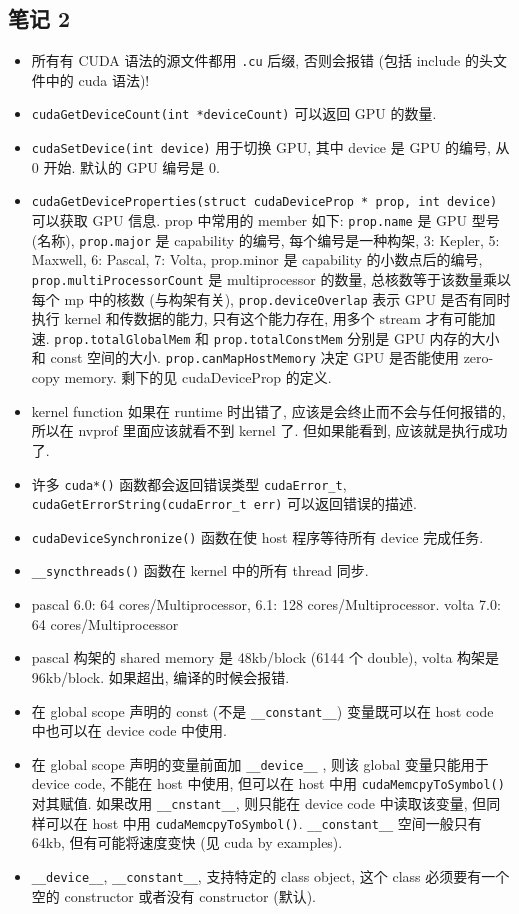 \subsection{笔记 2}
\begin{itemize}
\item 所有有 CUDA 语法的源文件都用 \verb`.cu` 后缀, 否则会报错 (包括 include 的头文件中的 cuda 语法)!
\item \verb`cudaGetDeviceCount(int *deviceCount)` 可以返回 GPU 的数量.
\item \verb`cudaSetDevice(int device)` 用于切换 GPU, 其中 device 是 GPU 的编号, 从 0 开始. 默认的 GPU 编号是 0.
\item \verb`cudaGetDeviceProperties(struct cudaDeviceProp * prop, int device)` 可以获取 GPU 信息. prop 中常用的 member 如下:
\verb`prop.name` 是 GPU 型号 (名称), \verb`prop.major` 是 capability 的编号, 每个编号是一种构架, 3: Kepler,  5: Maxwell, 6: Pascal, 7: Volta, prop.minor 是 capability 的小数点后的编号, \verb`prop.multiProcessorCount` 是 multiprocessor 的数量, 总核数等于该数量乘以每个 mp 中的核数 (与构架有关), \verb`prop.deviceOverlap` 表示 GPU 是否有同时执行 kernel 和传数据的能力, 只有这个能力存在, 用多个 stream 才有可能加速.
\verb`prop.totalGlobalMem` 和 \verb`prop.totalConstMem` 分别是 GPU 内存的大小和 const 空间的大小. \verb`prop.canMapHostMemory` 决定 GPU 是否能使用 zero-copy memory. 剩下的见 cudaDeviceProp 的定义.
\item kernel function 如果在 runtime 时出错了, 应该是会终止而不会与任何报错的, 所以在 nvprof 里面应该就看不到 kernel 了. 但如果能看到, 应该就是执行成功了.
\item 许多 \verb`cuda*()` 函数都会返回错误类型 \verb`cudaError_t`, \verb`cudaGetErrorString(cudaError_t err)` 可以返回错误的描述.
\item \verb`cudaDeviceSynchronize()` 函数在使 host 程序等待所有 device 完成任务.
\item \verb`__syncthreads()` 函数在 kernel 中的所有 thread 同步.
\item pascal 6.0: 64 cores/Multiprocessor, 6.1: 128 cores/Multiprocessor.   volta 7.0: 64 cores/Multiprocessor
\item pascal 构架的 shared memory 是 48kb/block (6144 个 double), volta 构架是 96kb/block. 如果超出, 编译的时候会报错.
\item 在 global scope 声明的 const (不是 \verb`__constant__`) 变量既可以在 host code 中也可以在 device code 中使用.
\item 在 global scope 声明的变量前面加 \verb`__device__` , 则该 global 变量只能用于 device code, 不能在 host 中使用, 但可以在 host 中用 \verb`cudaMemcpyToSymbol()` 对其赋值. 如果改用 \verb`__cnstant__`, 则只能在 device code 中读取该变量, 但同样可以在 host 中用 \verb`cudaMemcpyToSymbol()`. \verb`__constant__` 空间一般只有 64kb, 但有可能将速度变快 (见 cuda by examples).
\item \verb`__device__`, \verb`__constant__`, 支持特定的 class object, 这个 class 必须要有一个空的 constructor 或者没有 constructor (默认).


\end{itemize}

